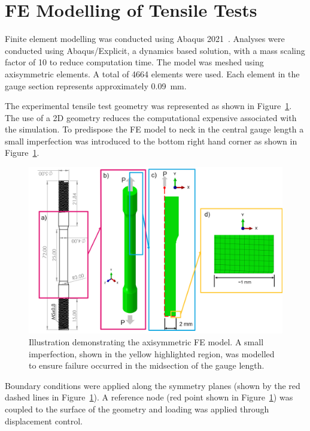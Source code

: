 \documentclass[preprint, review, 12pt]{elsarticle}
\begin{document}
{	%
	\section{FE Modelling of Tensile Tests}
	\label{h:fem}

	Finite element modelling was conducted using Abaqus 2021~\cite{DASSAULT2021}.
	Analyses were conducted using Abaqus/Explicit, a dynamics based solution, with a mass scaling factor of 10 to reduce computation time.
	The model was meshed using axisymmetric elements.
	A total of 4664 elements were used.
	Each element in the gauge section represents approximately 0.09~mm.

	The experimental tensile test geometry was represented as shown in Figure~\ref{fig:fe_model}.
	The use of a 2D geometry reduces the computational expensive associated with the simulation.
	To predispose the FE model to neck in the central gauge length a small imperfection was introduced to the bottom right hand corner as shown in Figure~\ref{fig:fe_model}.

	\begin{figure}[!htbp]
		\centering
		\includegraphics[width=\linewidth, height=0.5\textheight, keepaspectratio]{MODEL_3D_2D}
		\caption{Illustration demonstrating the axisymmetric FE model. A small imperfection, shown in the yellow highlighted region, was modelled to ensure failure occurred in the midsection of the gauge length.}
		\label{fig:fe_model}
	\end{figure}

	Boundary conditions were applied along the symmetry planes (shown by the red dashed lines in Figure~\ref{fig:fe_model}).
	A reference node (red point shown in Figure~\ref{fig:fe_model}) was coupled to the surface of the geometry and loading was applied through displacement control.

}
\end{document}
